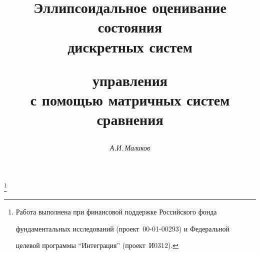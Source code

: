 




%





\newcommand{\uA}{\underline A}


\newcommand{\uk}{\underline k}


\newcommand{\col}{\operatorname{col}}


\newcommand{\dom}{\operatorname{dom}}


\newcommand{\const}{\operatorname{const}}


\newcommand{\Tr}{\operatorname{Tr}}


\newcommand{\tts}[1]{}




\renewcommand{\baselinestretch}{0.98}







\setcounter{page}{53}

















\author{\it А.И.\,Маликов}




\title{Эллипсоидальное оценивание состояния\\ дискретных систем


управления\\ с помощью матричных систем сравнения}


\thanks{Работа выполнена при финансовой поддержке Российского фонда


фундаментальных исследований (проект \No\,00-01-00293) и Федеральной


целевой программы ``Интеграция'' (проект \No\,И0312).}





